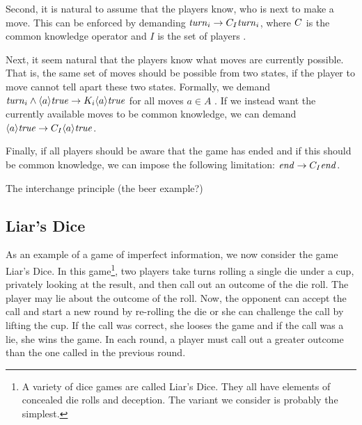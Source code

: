 Second, it is natural to assume that the players know, who is next to make a move. This can be enforced by demanding $ \mathit{turn}_{i} \rightarrow C_{I} \mathit{turn}_{i} $, where $ C $ is the common knowledge operator and $ I $ is the set of players \cite{benthem2001a}.

Next, it seem natural that the players know what moves are currently possible. That is, the same set of moves should be possible from two states, if the player to move cannot tell apart these two states. Formally, we demand $ \mathit{turn}_{i} \wedge \langle a \rangle \mathit{true} \rightarrow K_{i} \langle a \rangle \mathit{true} $ for all moves $ a \in A $ \cite{benthem2001a}. If we instead want the currently available moves to be common knowledge, we can demand $ \langle a \rangle \mathit{true} \rightarrow C_{I} \langle a \rangle \mathit{true} $.

Finally, if all players should be aware that the game has ended and if this should be common knowledge, we can impose the following limitation: $ \mathit{end} \rightarrow C_{I} \mathit{end} $.

{ \color{red} The interchange principle (the beer example?)}



\subsection{Liar's Dice}

As an example of a game of imperfect information, we now consider the game Liar's Dice. In this game\footnote{A variety of dice games are called Liar's Dice. They all have elements of concealed die rolls and deception. The variant we consider is probably the simplest.}, two players take turns rolling a single die under a cup, privately looking at the result, and then call out an outcome of the die roll. The player may lie about the outcome of the roll. Now, the opponent can accept the call and start a new round by re-rolling the die or she can challenge the call by lifting the cup. If the call was correct, she looses the game and if the call was a lie, she wins the game. In each round, a player must call out a greater outcome than the one called in the previous round.

